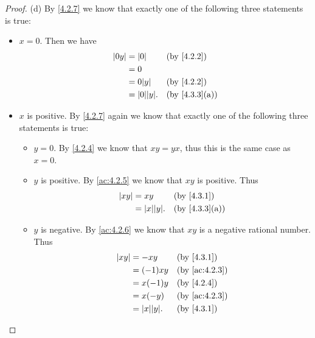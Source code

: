 \begin{proof}{(d)}
  By \cref{4.2.7} we know that exactly one of the following three statements is true:
  \begin{itemize}
    \item \(x = 0\).
          Then we have
          \begin{align*}
            \abs{0y} & = \abs{0}          &  & \by{4.2.2}                  \\
                     & = 0                                                 \\
                     & = 0 \abs{y}        &  & \by{4.2.2}                  \\
                     & = \abs{0} \abs{y}. &  & \text{(by \cref{4.3.3}(a))}
          \end{align*}
    \item \(x\) is positive.
          By \cref{4.2.7} again we know that exactly one of the following three statements is true:
          \begin{itemize}
            \item \(y = 0\).
                  By \cref{4.2.4} we know that \(xy = yx\), thus this is the same case as \(x = 0\).
            \item \(y\) is positive.
                  By \cref{ac:4.2.5} we know that \(xy\) is positive.
                  Thus
                  \begin{align*}
                    \abs{xy} & = xy               &  & \by{4.3.1}                  \\
                             & = \abs{x} \abs{y}. &  & \text{(by \cref{4.3.3}(a))}
                  \end{align*}
            \item \(y\) is negative.
                  By \cref{ac:4.2.6} we know that \(xy\) is a negative rational number.
                  Thus
                  \begin{align*}
                    \abs{xy} & = -xy              &  & \by{4.3.1}                  \\
                             & = (-1)xy           &  & \text{(by \cref{ac:4.2.3})} \\
                             & = x(-1)y           &  & \by{4.2.4}                  \\
                             & = x(-y)            &  & \text{(by \cref{ac:4.2.3})} \\
                             & = \abs{x} \abs{y}. &  & \by{4.3.1}                  \\

\end{align*}
\end{itemize}
\end{itemize}
\end{proof}
